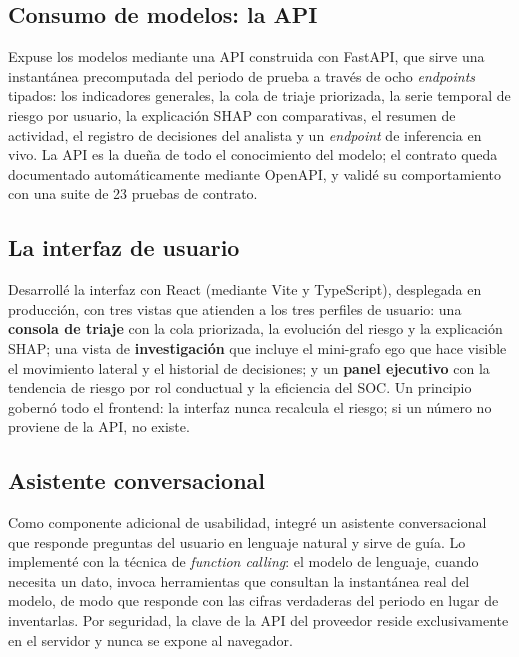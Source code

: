 \documentclass[12pt, a4paper]{article}
\begin{document}
\subsection{Consumo de modelos: la API}

Expuse los modelos mediante una API construida con FastAPI, que sirve una instantánea precomputada
del periodo de prueba a través de ocho \textit{endpoints} tipados: los indicadores generales, la cola
de triaje priorizada, la serie temporal de riesgo por usuario, la explicación SHAP con comparativas,
el resumen de actividad, el registro de decisiones del analista y un \textit{endpoint} de inferencia
en vivo. La API es la dueña de todo el conocimiento del modelo; el contrato queda documentado
automáticamente mediante OpenAPI, y validé su comportamiento con una suite de 23 pruebas de contrato.

\subsection{La interfaz de usuario}

Desarrollé la interfaz con React (mediante Vite y TypeScript), desplegada en producción, con tres
vistas que atienden a los tres perfiles de usuario: una \textbf{consola de triaje} con la cola
priorizada, la evolución del riesgo y la explicación SHAP; una vista de \textbf{investigación} que
incluye el mini-grafo ego que hace visible el movimiento lateral y el historial de decisiones; y un
\textbf{panel ejecutivo} con la tendencia de riesgo por rol conductual y la eficiencia del SOC. Un
principio gobernó todo el frontend: la interfaz nunca recalcula el riesgo; si un número no proviene de
la API, no existe.

\subsection{Asistente conversacional}

Como componente adicional de usabilidad, integré un asistente conversacional que responde preguntas
del usuario en lenguaje natural y sirve de guía. Lo implementé con la técnica de
\textit{function calling}: el modelo de lenguaje, cuando necesita un dato, invoca herramientas que
consultan la instantánea real del modelo, de modo que responde con las cifras verdaderas del periodo
en lugar de inventarlas. Por seguridad, la clave de la API del proveedor reside exclusivamente en el
servidor y nunca se expone al navegador.

\end{document}
